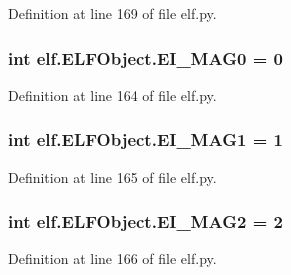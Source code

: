 Definition at line 169 of file elf.\+py.

\subsubsection[{\texorpdfstring{E\+I\+\_\+\+M\+A\+G0}{EI_MAG0}}]{\setlength{\rightskip}{0pt plus 5cm}int elf.\+E\+L\+F\+Object.\+E\+I\+\_\+\+M\+A\+G0 = 0\hspace{0.3cm}{\ttfamily [static]}}\hypertarget{clasself_1_1_e_l_f_object_abd4387dff6d4d596f1ce77f5d6e2c18f}{}\label{clasself_1_1_e_l_f_object_abd4387dff6d4d596f1ce77f5d6e2c18f}


Definition at line 164 of file elf.\+py.

\subsubsection[{\texorpdfstring{E\+I\+\_\+\+M\+A\+G1}{EI_MAG1}}]{\setlength{\rightskip}{0pt plus 5cm}int elf.\+E\+L\+F\+Object.\+E\+I\+\_\+\+M\+A\+G1 = 1\hspace{0.3cm}{\ttfamily [static]}}\hypertarget{clasself_1_1_e_l_f_object_a33d886b2e3419793cb9439032378ec88}{}\label{clasself_1_1_e_l_f_object_a33d886b2e3419793cb9439032378ec88}


Definition at line 165 of file elf.\+py.

\subsubsection[{\texorpdfstring{E\+I\+\_\+\+M\+A\+G2}{EI_MAG2}}]{\setlength{\rightskip}{0pt plus 5cm}int elf.\+E\+L\+F\+Object.\+E\+I\+\_\+\+M\+A\+G2 = 2\hspace{0.3cm}{\ttfamily [static]}}\hypertarget{clasself_1_1_e_l_f_object_ac222ac9fb8955262b0d6c922344a19b2}{}\label{clasself_1_1_e_l_f_object_ac222ac9fb8955262b0d6c922344a19b2}


Definition at line 166 of file elf.\+py.

